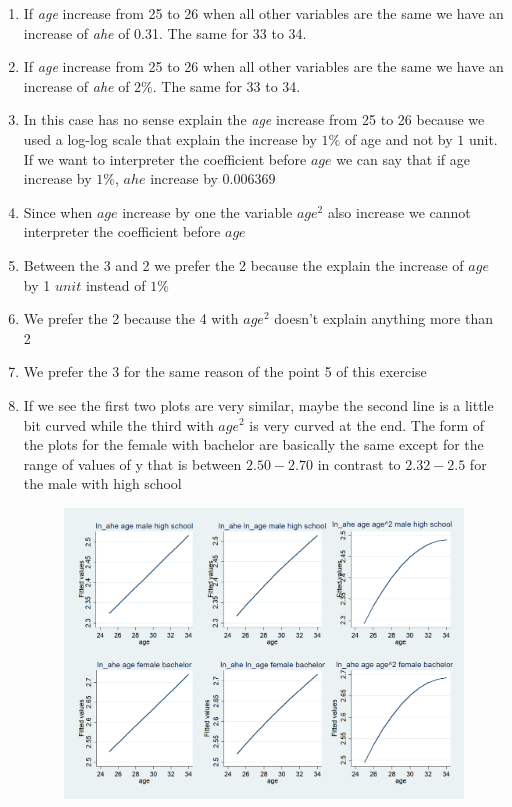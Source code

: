 \documentclass[10pt,a4paper]{article}
\author{Michele De Vita}
\begin{document}
	\begin{enumerate}
		\item If \textit{age} increase from 25 to 26 when all other variables are the same we have an increase of \textit{ahe} of 0.31. The same for 33 to 34.
		\item  If \textit{age} increase from 25 to 26 when all other variables are the same we have an increase of \textit{ahe} of $ 2\% $. The same for 33 to 34.
		\item In this case has no sense explain the \textit{age} increase from 25 to 26 because we used a log-log scale that explain the increase by $ 1\% $ of age and not by $ 1 $ unit. If we want to interpreter the coefficient before $ age $ we can say that if age increase by $ 1\% $,  $ ahe $  increase by $ 0.006369 $
		\item Since when $ age  $ increase by one the variable $ age^2 $ also increase we cannot interpreter the coefficient before $ age $
		\item Between the 3 and 2 we prefer the 2 because the explain the increase of $ age $ by 1 $ unit $ instead of $ 1\% $ 
		\item We prefer the 2 because the 4 with $ age^2 $ doesn't explain anything more than 2
		\item We prefer the 3 for the same reason of the point 5 of this exercise
		\item 
		If we see the first two plots are very similar, maybe the second line is a little bit curved while the third with $ age^2 $ is very curved at the end.
		The form of the plots for the female with bachelor are basically the same except for the range of values of y that is between $ 2.50 - 2.70 $ in contrast to $ 2.32 - 2.5 $ for the male with high school
		\begin{figure}[H]
			\centering
			\includegraphics[width=0.7\linewidth]{plot_6_regressions}
		\end{figure}

\end{enumerate}
\end{document}
